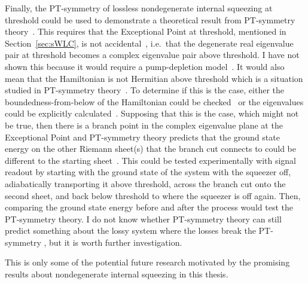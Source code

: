Finally, the PT-symmetry of lossless nondegenerate internal squeezing at threshold could be used to demonstrate a theoretical result from PT-symmetry theory~\cite{CMBPersonalCommunication}. This requires that the Exceptional Point at threshold, mentioned in Section~\ref{sec:sWLC}, is not accidental~\cite{}, i.e.\ that the degenerate real eigenvalue pair at threshold becomes a complex eigenvalue pair above threshold. I have not shown this because it would require a pump-depletion model~\cite{}. It would also mean that the Hamiltonian is not Hermitian above threshold which is a situation studied in PT-symmetry theory~\cite{}. To determine if this is the case, either the boundedness-from-below of the Hamiltonian could be checked~\cite{} or the eigenvalues could be explicitly calculated~\cite{}. Supposing that this is the case, which might not be true, then there is a branch point in the complex eigenvalue plane at the Exceptional Point and PT-symmetry theory predicts that the ground state energy on the other Riemann sheet(s) that the branch cut connects to could be different to the starting sheet~\cite{}. This could be tested experimentally with signal readout by starting with the ground state of the system with the squeezer off, adiabatically transporting it above threshold, across the branch cut onto the second sheet, and back below threshold to where the squeezer is off again. Then, comparing the ground state energy before and after the process would test the PT-symmetry theory. I do not know whether PT-symmetry theory can still predict something about the lossy system where the losses break the PT-symmetry , but it is worth further investigation.

This is only some of the potential future research motivated by the promising results about nondegenerate internal squeezing in this thesis.

